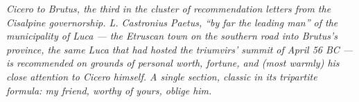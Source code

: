 
\textit{Cicero to Brutus, the third in the cluster of recommendation
letters from the Cisalpine governorship. L. Castronius Paetus,
``by far the leading man'' of the municipality of Luca --- the
Etruscan town on the southern road into Brutus's province, the same
Luca that had hosted the triumvirs' summit of April 56 BC --- is
recommended on grounds of personal worth, fortune, and (most warmly)
his close attention to Cicero himself. A single section, classic in
its tripartite formula: \textit{my friend, worthy of yours, oblige
him}.}
